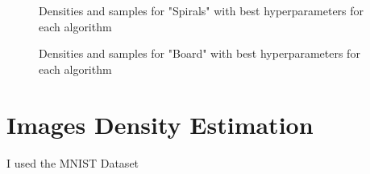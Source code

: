 \begin{figure}[H]
    \centering
    \label{fig:spirals_best}
    \caption{Densities and samples for "Spirals" with best hyperparameters for each algorithm}
\end{figure}

\begin{figure}[H]
    \centering
    \label{fig:board_best}
    \caption{Densities and samples for "Board" with best hyperparameters for each algorithm}
\end{figure}


\section{Images Density Estimation}

I used the MNIST Dataset \cite{mnist} 

